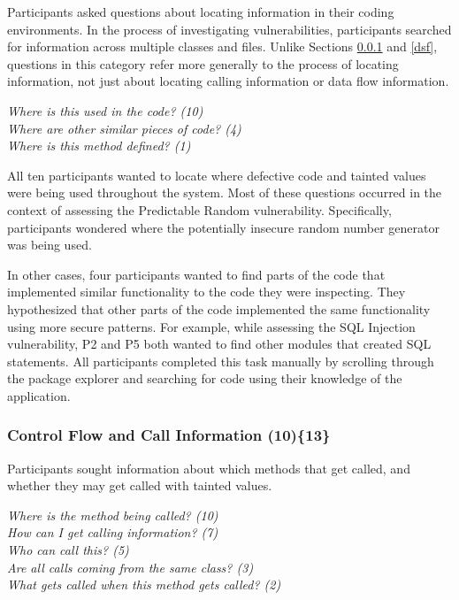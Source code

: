 \documentclass{acm_proc_article-sp}
\begin{document}
Participants asked questions about locating information in their coding environments.
In the process of investigating vulnerabilities, participants searched for information across multiple classes and files.
Unlike Sections \ref{cf} and \ref{dsf}, questions in this category refer more generally to the process of locating information, not just about locating calling information or data flow information.

\noindent\emph{Where is this used in the code? (10)} \\
\emph{Where are other similar pieces of code? (4)} \\
\emph{Where is this method defined? (1)} 



 
All ten participants wanted to locate where defective code and tainted values were being used throughout the system. 
Most of these questions occurred in the context of assessing the Predictable Random vulnerability.
Specifically, participants wondered where the potentially insecure random number generator was being used.

In other cases, four participants wanted to find parts of the code that implemented similar functionality to the code they were inspecting.
They hypothesized that other parts of the code implemented the same functionality using more secure patterns. 
For example, while assessing the SQL Injection vulnerability, P2 and P5 both wanted to find other modules that created SQL statements.
All participants completed this task manually by scrolling through the package explorer and searching for code using their knowledge of the application.



\subsubsection{\textbf{Control Flow and Call Information (10)\{13\}}}\label{cf}
Participants sought information about which methods that get called, and whether they may get called with tainted values.


\noindent\emph{Where is the method being called? (10)} \\
\emph{How can I get calling information? (7)} \\
\emph{Who can call this? (5)} \\
\emph{Are all calls coming from the same class? (3)} \\
\emph{What gets called when this method gets called? (2)}
\end{document}
